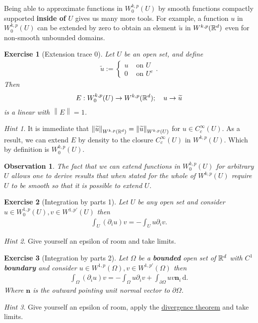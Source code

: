 \documentclass[12pt]{article}
\newtheorem{observation}{Observation}
\newtheorem{exercise}{Exercise}
\theoremstyle{remark}
\newtheorem*{hint}{Hint}
\renewcommand{\norm}[1]{\left\lVert #1 \right\rVert}\renewcommand{\abs}[1]{\left| #1 \right|}
\newcommand{\tl}[1]{\widetilde{#1}}
\renewcommand{\d}{\,\mathrm{d}}
\begin{document}
Being able to approximate functions in $W_0^{k,p}(U)$ by smooth functions compactly supported  \textbf{inside of} $U$  gives us many more tools. For example, a function $u$ in $W^{k,p}_0(U)$ can be extended by zero to obtain an element $\tl{u}$ in $W^{k,p}(\mathbb{R}^d)$ even for non-smooth unbounded domains.
\begin{exercise}[Extension trace 0]
	Let $U$ be an open set,     and define
	\begin{align*}
		\widetilde{u}:=\begin{cases}
			               u & \text{ on } U   \\
			               0 & \text{ on } U^c
		               \end{cases}.
	\end{align*}
	Then
	\begin{align*}
		E: W_0^{k,p}(U) \to W^{k,p}(\mathbb{R}^d); \quad  u \to \widetilde{u}
	\end{align*}
	is a linear with $\norm{E}=1$.
\end{exercise}
\begin{hint}
	It is immediate that $\norm{\widetilde{u}}_{W^{k,p}(\R^d)}=\norm{\widetilde{u}}_{W^{k,p}(U)}$ for $u \in C_c^\infty(U)$. As a result, we can extend $E$ by density to the closure $C_c^\infty(U)$ in $W^{k,p}(U)$. Which by definition is  $W^{k,p}_0(U)$.
\end{hint}
\begin{observation}
	The fact that we can extend functions in $W^{k,p}_0(U)$ for arbitrary  $U$ allows one to derive results that when stated for the whole of $W^{k,p}(U)$ require $U$ to be smooth so that it is possible to extend $U$.
\end{observation}
\begin{exercise}[Integration by parts 1] Let $U$ be any open set and consider $u \in  W^{1,p}_0(U), v \in W^{1,p'}(U)$ then
	\begin{align*}
		\int_{U} (\partial _iu) v = -\int_{U}u \partial _i v  .
	\end{align*}
\end{exercise}
\begin{hint}
	Give yourself an epsilon of room and take limits.
\end{hint}
\begin{exercise}[Integration by parts 2] Let $\Omega $ be a \textbf{bounded} open set of $\mathbb{R}^d$ with $C^1$  \textbf{boundary} and consider $u \in  W^{1,p}(\Omega), v \in W^{1,p'}(\Omega)$ then
	\begin{align*}
		\int_{\Omega} (\partial _iu) v = -\int_{\Omega}u \partial _i v+ \int_{\partial \Omega} u v \textbf{n}_i  \d   .
	\end{align*}
	Where $\textbf{n} $ is the outward pointing unit normal vector to $\partial \Omega$.
\end{exercise}
\begin{hint}
	Give yourself an epsilon of room, apply the \href{https://en.wikipedia.org/wiki/Divergence_theorem#:~:text=space%5Bedit%5D-,We,-are%20going%20to%20prove}{divergence theorem} and take limits.
\end{hint}
\end{document}
